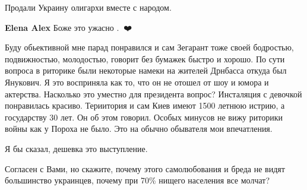 \begin{itemize}
\begin{itemize}
Продали Украину олигархи вместе с народом.

 
\textbf{Elena Alex} Боже это ужасно .🌹🙏❤️
\end{itemize}

 

Буду обьективной мне парад понравился и сам Зегарант тоже своей бодростью,
подвижностью, молодостью, говорит без бумажек быстро и хорошо. По сути вопроса
в риторике были некоторые намеки на жителей Дрнбасса откуда был Янукович. Я это
восприняла как то, что он не отошел от шоу и юмора и актерства. Насколько это
уместно для президента вопрос? Инсталяция с девочкой понравилась красиво.
Териитория и сам Киев имеют 1500 летнюю истрию, а государству 30 лет. Он об
этом говорил. Особых минусов не вижу риторики войны как у Пороха не было. Это
на обычно обывателя мои впечатления.


 
Я бы сказал, дешевка это выступление.

 

Согласен с Вами, но скажите, почему этого самолюбования и бреда не видят
большинство украинцев, почему при 70\% нищего населения все молчат?

 

\end{itemize}

